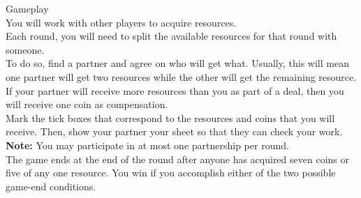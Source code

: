\begin{minipage}{6cm}\raggedright
{\setmainfont[Scale=0.95]{Century Gothic-Bold}\LARGE Gameplay}\\[1.0ex]

\setmainfont{Tex Gyre Schola}
You will work with other players to acquire resources.\\[1.25ex]

Each round, you will need to split the available resources for that round with someone.\\[1.25ex]

To do so, find a partner and agree on who will get what. Usually, this will mean one partner will get two resources while the other will get the remaining resource.\\[1.25ex]

If your partner will receive more resources than you as part of a deal, then you will receive one coin as compensation. \\[1.25ex]

Mark the tick boxes that correspond to the resources and coins that you will receive. Then, show your partner your sheet so that they can check your work.\\[1.25ex]

\textbf{Note:} You may participate in at most one partnership per round.\\[1.25ex]

The game ends at the end of the round after anyone has acquired seven coins or five of any one resource. You win if you accomplish either of the two possible game-end conditions. 


\end{minipage}